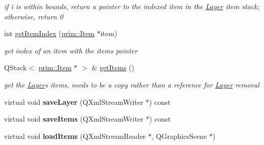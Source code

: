\begin{DoxyCompactItemize}
\begin{DoxyCompactList}\small\item\em if i is within bounds, return a pointer to the indexed item in the \hyperlink{classprim_1_1Layer}{Layer} item stack; otherwise, return 0 \end{DoxyCompactList}\item 
int \hyperlink{classprim_1_1Layer_a071458923f67767d195db5b5648fa319}{get\+Item\+Index} (\hyperlink{classprim_1_1Item}{prim\+::\+Item} $\ast$item)\hypertarget{classprim_1_1Layer_a071458923f67767d195db5b5648fa319}{}\label{classprim_1_1Layer_a071458923f67767d195db5b5648fa319}

\begin{DoxyCompactList}\small\item\em get index of an item with the item\textquotesingle{}s pointer \end{DoxyCompactList}\item 
Q\+Stack$<$ \hyperlink{classprim_1_1Item}{prim\+::\+Item} $\ast$ $>$ \& \hyperlink{classprim_1_1Layer_a022327a92847e76871302f38e690353c}{get\+Items} ()\hypertarget{classprim_1_1Layer_a022327a92847e76871302f38e690353c}{}\label{classprim_1_1Layer_a022327a92847e76871302f38e690353c}

\begin{DoxyCompactList}\small\item\em get the \hyperlink{classprim_1_1Layer}{Layer}\textquotesingle{}s items, needs to be a copy rather than a reference for \hyperlink{classprim_1_1Layer}{Layer} removal \end{DoxyCompactList}\item 
virtual void {\bfseries save\+Layer} (Q\+Xml\+Stream\+Writer $\ast$) const \hypertarget{classprim_1_1Layer_a753a4827ef2d94d0088954fc5547ba70}{}\label{classprim_1_1Layer_a753a4827ef2d94d0088954fc5547ba70}

\item 
virtual void {\bfseries save\+Items} (Q\+Xml\+Stream\+Writer $\ast$) const \hypertarget{classprim_1_1Layer_ab4b8201df3846ac6298b5e8118e2ee74}{}\label{classprim_1_1Layer_ab4b8201df3846ac6298b5e8118e2ee74}

\item 
virtual void {\bfseries load\+Items} (Q\+Xml\+Stream\+Reader $\ast$, Q\+Graphics\+Scene $\ast$)\hypertarget{classprim_1_1Layer_a2921e285a2636f675fa23269393697b6}{}\label{classprim_1_1Layer_a2921e285a2636f675fa23269393697b6}

\end{DoxyCompactItemize}
